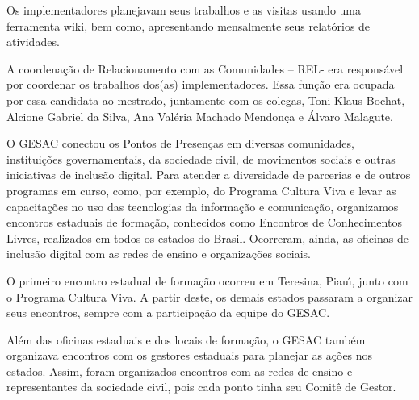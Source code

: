 \documentclass[
12pt,		%
openright,	%
twoside,  %
a4paper,			%
chapter=TITLE,		%
english,			%
french,				%
spanish,			%
brazil				%
]{USPSC-classe/USPSC}
\begin{document}
Os implementadores planejavam seus trabalhos e as visitas usando uma ferramenta wiki, bem como, apresentando mensalmente seus relat\'orios de atividades.










A coordena\c{c}\~ao de Relacionamento com as Comunidades – REL- era respons\'avel por coordenar os trabalhos dos(as) implementadores. Essa fun\c{c}\~ao era ocupada por essa candidata ao mestrado,  juntamente com os colegas, Toni Klaus Bochat, Alcione  Gabriel da Silva, Ana Val\'eria Machado Mendon\c{c}a e \'Alvaro Malagute.










O GESAC conectou os Pontos de Presen\c{c}as em diversas comunidades, institui\c{c}\~oes governamentais, da sociedade civil, de movimentos sociais e outras iniciativas de inclus\~ao digital. Para  atender a diversidade de parcerias  e de outros programas em curso, como, por exemplo, do Programa Cultura Viva e levar as  capacita\c{c}\~oes no uso das tecnologias da informa\c{c}\~ao e comunica\c{c}\~ao, organizamos encontros estaduais de forma\c{c}\~ao, conhecidos como Encontros de Conhecimentos Livres, realizados em todos os estados do Brasil. Ocorreram, ainda, as  oficinas de inclus\~ao digital com as redes de ensino e organiza\c{c}\~oes sociais.










O primeiro encontro estadual de forma\c{c}\~ao ocorreu em  Teresina, Piau\'{\i}, junto com o Programa Cultura Viva. A partir deste, os demais estados passaram a organizar seus encontros, sempre com a participa\c{c}\~ao da equipe do GESAC.










Al\'em das oficinas estaduais e dos locais de forma\c{c}\~ao, o GESAC tamb\'em organizava encontros com os gestores estaduais para planejar as a\c{c}\~oes nos estados. Assim, foram organizados encontros com as redes de ensino e  representantes da sociedade civil, pois cada ponto  tinha seu Comit\^e de Gestor.
\end{document}
